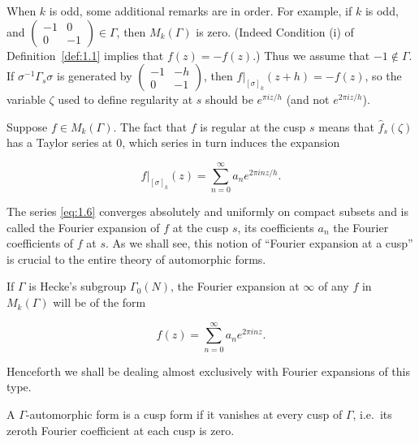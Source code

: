 When $k$ is odd, some additional remarks are in order. For example, if $k$ is odd, and $\begin{pmatrix} -1 & 0 \\ 0 & -1 \end{pmatrix} \in \Gamma$, then $M_k(\Gamma)$ is zero. (Indeed Condition (i) of Definition~\ref{def:1.1} implies that $f(z) = -f(z)$.) Thus we assume that $-1 \notin \Gamma$. If $\sigma^{-1}\Gamma_s\sigma$ is generated by $\begin{pmatrix} -1 & -h \\ 0 & -1 \end{pmatrix}$, then $f|_{[\sigma]_k}(z + h) = -f(z)$, so the variable $\zeta$ used to define regularity at $s$ should be $e^{\pi iz/h}$ (and not $e^{2\pi iz/h}$).

\begin{remark}\label{rem:1.3}

Suppose $f \in M_k(\Gamma)$. The fact that $f$ is regular at the cusp $s$ means that $\hat{f}_s(\zeta)$ has a Taylor series at $0$, which series in turn induces the expansion

\begin{equation}\label{eq:1.6}
f\big|_{[\sigma]_k}(z) = \sum_{n=0}^{\infty} a_n e^{2\pi inz/h}.\tag{1.6}
\end{equation}

The series \eqref{eq:1.6} converges absolutely and uniformly on compact subsets and is called the Fourier expansion of $f$ at the cusp $s$, its coefficients $a_n$ the Fourier coefficients of $f$ at $s$. As we shall see, this notion of ``Fourier expansion at a cusp'' is crucial to the entire theory of automorphic forms.

If $\Gamma$ is Hecke's subgroup $\Gamma_0(N)$, the Fourier expansion at $\infty$ of any $f$ in $M_k(\Gamma)$ will be of the form

\begin{equation}\label{eq:1.7}
f(z) = \sum_{n=0}^{\infty} a_n e^{2\pi inz}.\tag{1.7}
\end{equation}

Henceforth we shall be dealing almost exclusively with Fourier expansions of this type.

\end{remark}

\begin{definition}\label{def:1.4}

A $\Gamma$-automorphic form is a cusp form if it vanishes at every cusp of $\Gamma$, i.e.\ its zeroth Fourier coefficient at each cusp is zero.

\end{definition}

